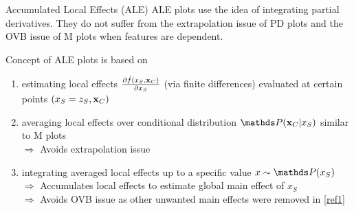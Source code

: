\documentclass[11pt,compress,t,notes=noshow, aspectratio=169, xcolor=table]{beamer}
\begin{document}
\begin{frame}{Accumulated Local Effects (ALE) }
ALE plots use the idea of integrating partial derivatives. They do not suffer from the extrapolation issue of PD plots and the OVB issue of M plots when features are dependent.

\lz
Concept of ALE plots is based on
\begin{enumerate}[<+->]
\item estimating local effects $\frac{\partial \fh(x_S, \xv_C)}{\partial x_S}$ (via finite differences) evaluated at certain points $(x_S = z_S, \xv_C)$\label{ref1}
\item averaging local effects over conditional distribution $\P(\xv_C|x_S)$ similar to M plots\\ %
$\Rightarrow$ Avoids extrapolation issue\label{ref2}
\item integrating averaged local effects up to a specific value $x \sim \P(x_S)$\\ %
$\Rightarrow$ Accumulates local effects to estimate global main effect of $x_S$\\
$\Rightarrow$ Avoids OVB issue as other unwanted main effects were removed in \eqref{ref1} \label{ref3}
\end{enumerate}

\end{frame}
\end{document}
